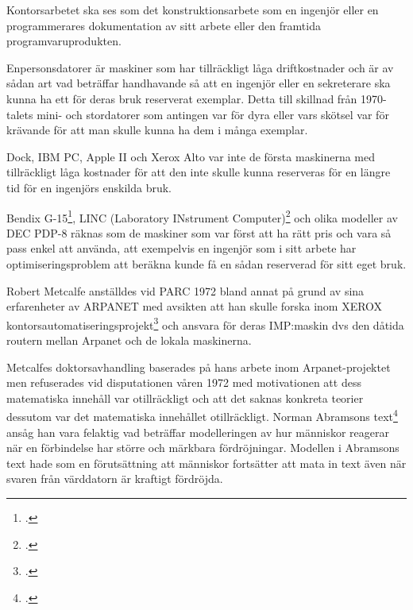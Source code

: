 \documentclass[swedish,10pt,a4paper]{report}
\begin{document}
Kontorsarbetet ska ses som det konstruktionsarbete som en ingenjör eller
en programmerares dokumentation av sitt arbete eller den framtida
programvaruprodukten.

Enpersonsdatorer är maskiner som har tillräckligt låga driftkostnader
och är av sådan art vad beträffar handhavande så att en ingenjör
eller en sekreterare ska kunna ha ett för deras bruk reserverat exemplar.
Detta till skillnad från 1970-talets mini- och stordatorer som antingen var för
dyra eller vars skötsel var för krävande för att man skulle kunna ha dem i många exemplar.

Dock, IBM PC, Apple II och Xerox Alto var inte de första maskinerna med tillräckligt
låga kostnader för att den inte skulle kunna reserveras för en längre tid för en ingenjörs
enskilda bruk.

Bendix G-15\footcite{BendixG15brochure}, LINC (Laboratory INstrument Computer)\footcite{LINCLightsout}
och olika modeller av DEC PDP-8 räknas som de maskiner som var först att ha rätt pris och
vara så pass enkel att använda, att exempelvis en ingenjör som i sitt arbete har optimiseringsproblem att beräkna
kunde få en sådan reserverad för sitt eget bruk.




Robert Metcalfe anställdes vid PARC 1972 bland annat på grund av sina erfarenheter av ARPANET
med avsikten att han skulle forska inom XEROX kontorsautomatiseringsprojekt\footcite[kap 6 sekt 7]{PelkeyChap6s7}
och ansvara för deras IMP:maskin dvs den dåtida routern mellan Arpanet och de lokala maskinerna.

Metcalfes doktorsavhandling baserades på hans arbete inom Arpanet-projektet men refuserades vid disputationen
våren 1972 med motivationen att dess matematiska innehåll var otillräckligt och att det saknas konkreta teorier
dessutom var det matematiska innehållet otillräckligt.
Norman Abramsons text\footcite{AbramsonAloha} ansåg han vara felaktig vad
beträffar modelleringen av hur människor reagerar när en förbindelse har
större och märkbara fördröjningar. Modellen i Abramsons text hade som en förutsättning att människor fortsätter
att mata in text även när svaren från värddatorn är kraftigt fördröjda.
\end{document}

